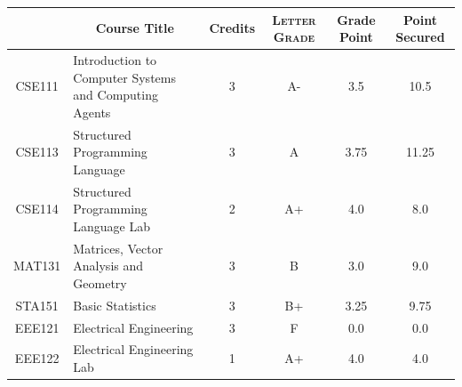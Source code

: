 \documentclass[11pt]{article}
\newcommand*{\numtwo}[1]{\pgfmathprintnumber[
                    fixed, precision=2, fixed zerofill=true]{#1}}
\begin{document}
                \begin{center}
                    \renewcommand{\arraystretch}{1.08}
                    
                \begin{tabular}{|c|l|c|>{\scshape}c|c|c|}
                \hline  \rule[-1ex]{0pt}{3.5ex} {\centering{\bf Course Code}} &  \multicolumn{1}{c|}{\textbf{Course Title}}  & {\bf Credits} & {\bf Letter Grade} & {\bf Grade Point} & {\bf Point Secured}  \\ 
                \hline   CSE111 &  Introduction to Computer Systems and Computing Agents		 & 3 & A- & 3.5 & 10.5 \\ %
                \hline   CSE113 &  Structured Programming Language		 & 3 & A & 3.75 & 11.25 \\ %
                \hline   CSE114 &  Structured Programming Language Lab		 & 2 & A+ & 4.0 & 8.0 \\ %
                \hline   MAT131 &  Matrices, Vector Analysis and Geometry		 & 3 & B & 3.0 & 9.0 \\ %
                \hline   STA151 &  Basic Statistics		 & 3 & B+ & 3.25 & 9.75 \\ %
                \hline   EEE121 &  Electrical Engineering		 & 3 & F & 0.0 & 0.0 \\ %
                \hline   EEE122 &  Electrical Engineering Lab		 & 1 & A+ & 4.0 & 4.0 \\ %

\hline                %
                \end{tabular}
                \end{center}
                \renewcommand{\arraystretch}{1.03}
\end{document}
